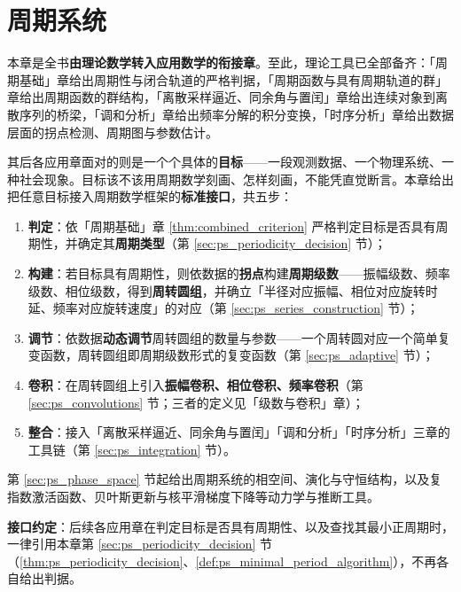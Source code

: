 \chapter{周期系统}
\label{chap:periodic_system}
\label{chap:periodic-system}

\begin{remark}\label{rem:periodic-system-positioning}
本章是全书\textbf{由理论数学转入应用数学的衔接章}。至此，理论工具已全部备齐：「周期基础」章给出周期性与闭合轨道的严格判据，「周期函数与具有周期轨道的群」章给出周期函数的群结构，「离散采样逼近、同余角与置闰」章给出连续对象到离散序列的桥梁，「调和分析」章给出频率分解的积分变换，「时序分析」章给出数据层面的拐点检测、周期图与参数估计。

其后各应用章面对的则是一个个具体的\textbf{目标}——一段观测数据、一个物理系统、一种社会现象。目标该不该用周期数学刻画、怎样刻画，不能凭直觉断言。本章给出把任意目标接入周期数学框架的\textbf{标准接口}，共五步：

\begin{enumerate}[label=(\arabic*)]
    \item \textbf{判定}：依「周期基础」章 \cref{thm:combined_criterion} 严格判定目标是否具有周期性，并确定其\textbf{周期类型}（第 \ref{sec:ps_periodicity_decision} 节）；
    \item \textbf{构建}：若目标具有周期性，则依数据的\textbf{拐点}构建\textbf{周期级数}——振幅级数、频率级数、相位级数，得到\textbf{周转圆组}，并确立「半径对应振幅、相位对应旋转时延、频率对应旋转速度」的对应（第 \ref{sec:ps_series_construction} 节）；
    \item \textbf{调节}：依数据\textbf{动态调节}周转圆组的数量与参数——一个周转圆对应一个简单复变函数，周转圆组即周期级数形式的复变函数（第 \ref{sec:ps_adaptive} 节）；
    \item \textbf{卷积}：在周转圆组上引入\textbf{振幅卷积、相位卷积、频率卷积}（第 \ref{sec:ps_convolutions} 节；三者的定义见「级数与卷积」章）；
    \item \textbf{整合}：接入「离散采样逼近、同余角与置闰」「调和分析」「时序分析」三章的工具链（第 \ref{sec:ps_integration} 节）。
\end{enumerate}

第 \ref{sec:ps_phase_space} 节起给出周期系统的相空间、演化与守恒结构，以及复指数激活函数、贝叶斯更新与核平滑梯度下降等动力学与推断工具。

\textbf{接口约定}：后续各应用章在判定目标是否具有周期性、以及查找其最小正周期时，一律引用本章第 \ref{sec:ps_periodicity_decision} 节（\cref{thm:ps_periodicity_decision}、\cref{def:ps_minimal_period_algorithm}），不再各自给出判据。
\end{remark}

